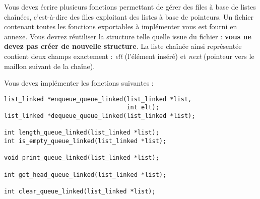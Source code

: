 

\vspace*{0.7cm}

\noindent {}

\bigskip

%

\noindent Vous devez écrire plusieurs fonctions permettant de gérer des files à base de listes chaînées, c'est-à-dire des files exploitant des listes à base de pointeurs.
Un fichier  contenant toutes les fonctions exportables à implémenter vous est fourni en annexe.
Vous devrez réutiliser la structure  telle quelle issue du fichier  : \textbf{vous ne devez pas créer de nouvelle structure}.
La liste chaînée ainsi représentée contient deux champs exactement : \textit{elt} (l'élément inséré) et \textit{next} (pointeur vers le maillon suivant de la chaîne).

\smallskip




\bigskip

\noindent Vous devez implémenter les fonctions suivantes :

\bigskip

\lstset{language=C}
\begin{lstlisting}[frame=single]
list_linked *enqueue_queue_linked(list_linked *list,
                                  int elt);
list_linked *dequeue_queue_linked(list_linked *list);

int length_queue_linked(list_linked *list);
int is_empty_queue_linked(list_linked *list);

void print_queue_linked(list_linked *list);

int get_head_queue_linked(list_linked *list);

int clear_queue_linked(list_linked *list);
\end{lstlisting}


